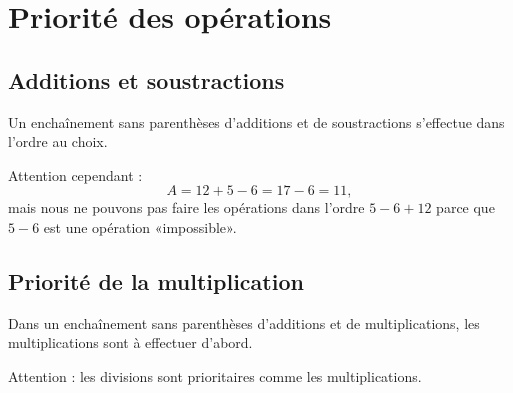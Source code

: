 
\section{Priorité des opérations}



\subsection{Additions et soustractions}

\begin{Aretenir}
    Un enchaînement sans parenthèses d'additions et de soustractions s'effectue dans l'ordre au choix.
\end{Aretenir}

Attention cependant :
\begin{equation}
    A=12+5-6=17-6=11,
\end{equation}
mais nous ne pouvons pas faire les opérations dans l'ordre \( 5-6+12\) parce que \( 5-6\) est une opération «impossible».

\subsection{Priorité de la multiplication}

\begin{Aretenir}
    Dans un enchaînement sans parenthèses d'additions et de multiplications, les multiplications sont à effectuer d'abord.

    Attention : les divisions sont prioritaires comme les multiplications.
\end{Aretenir}

